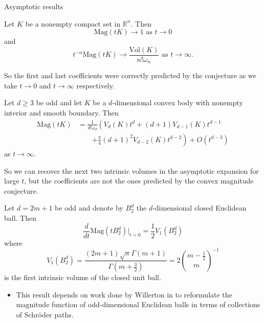 \documentclass[12pt,mathserif]{beamer}
\begin{document}
\begin{frame}[allowframebreaks]{Asymptotic results}

\begin{theorem}\label{thm:BCasymp}
Let $K$ be a nonempty compact set in $\mathbb{R}^n$. Then
\begin{equation*}
\text{Mag}(tK) \to 1 \text{ as $t\to0$}
\end{equation*}
and
\begin{equation*}
t^{-n}\text{Mag}(tK) \to \frac{\text{Vol}(K)}{n!\omega_n} \text{ as $t\to\infty$.}
\end{equation*}
\end{theorem}
So the first and last coefficients were correctly predicted by the conjecture as we take $t\to0$ and $t\to\infty$ respectively.

\framebreak

\begin{theorem}\label{thm:GGasymp}
Let $d\geq3$ be odd and let $K$ be a $d$-dimensional convex body with nonempty interior and smooth boundary. Then
\begin{align*}
\text{Mag}(tK) &= \frac{1}{d!\omega_d}\left(V_d(K)t^d+(d+1)V_{d-1}(K)t^{d-1}\right. \\
&\qquad \left.+\frac{\pi}{4}(d+1)^2V_{d-2}(K)t^{d-2}\right)+O\left(t^{d-3}\right)
\end{align*}
as $t\to\infty$.
\end{theorem}
So we can recover the next two intrinsic volumes in the asymptotic expansion for large $t$, but the coefficients are not the ones predicted by the convex magnitude conjecture.

\framebreak

\begin{theorem}\label{thm:meckesasymp}
Let $d=2m+1$ be odd and denote by $B_2^d$ the $d$-dimensional closed Euclidean ball. Then
\begin{equation*}
\frac{d}{dt}\text{Mag}\left(tB_2^d\right)\big\vert_{t=0} = \frac{1}{2}V_1\left(B_2^d\right)
\end{equation*}
where
\begin{equation*}
V_1\left(B_2^d\right) = \frac{(2m+1)\sqrt{\pi}\Gamma\left(m+1\right)}{\Gamma\left(m+\frac{3}{2}\right)} = 2\binom{m-\frac{1}{2}}{m}^{-1}
\end{equation*}
is the first intrinsic volume of the closed unit ball.
\end{theorem}

\begin{itemize}
\item This result depends on work done by Willerton in \cite{willerton_magnitude_2017} to reformulate the magnitude function of odd-dimensional Euclidean balls in terms of collections of Schröder paths.
\end{itemize}

\end{frame}
\end{document}
